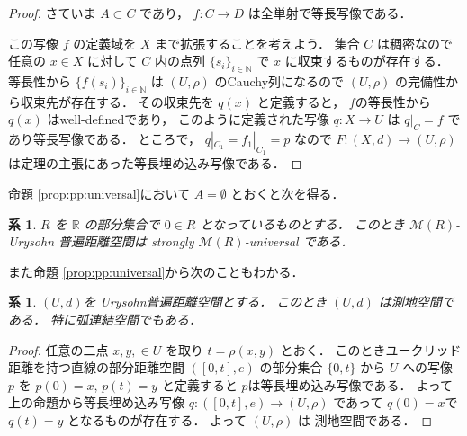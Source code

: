 \documentclass[leqno, 12pt]{jsarticle}
\newtheorem{cor}[thm]{系}
\newcommand{\nn}{\mathbb{N}}
\newcommand{\rr}{\mathbb{R}}
\begin{document}
\begin{proof}
さていま
$A\subset C$
であり，
$f\colon  C\to D$
は全単射で等長写像である．



この写像
$f$
の定義域を
$X$
まで拡張することを考えよう．
集合
$C$
は稠密なので任意の
$x\in X$
に対して
$C$
内の点列
$\{s_{i}\}_{i\in \nn}$
で
$x$
に収束するものが存在する．
等長性から
$\{f(s_{i})\}_{i\in \nn}$
は
$(U, \rho)$
のCauchy列になるので
$(U, \rho)$
の完備性から収束先が存在する．
その収束先を
$q(x)$
と定義すると，
$f$の等長性から
$q(x)$
はwell-definedであり，
このように定義された写像
$q\colon  X\to U$
は
$q|_{C}=f$
であり等長写像である．
ところで，
$q|_{C_1}=f_{1}|_{C_1}=p$
なので
$F\colon  (X, d)\to (U, \rho)$
は定理の主張にあった等長埋め込み写像である．
\end{proof}


命題 \ref{prop:pp:universal}において
$A=\emptyset$
とおくと次を得る．

\begin{cor}\label{cor:pp:omegauniversality}
$R$
を
$\rr$
の部分集合で
$0\in R$
となっているものとする．
このとき
$\mathscr{M}(R)$-Urysohn
普遍距離空間は
strongly 
$\mathscr{M}(R)$-universal
である．
\end{cor}



また命題 
\ref{prop:pp:universal}から次のこともわかる．

\begin{cor}\label{cor:pp:connected}
$(U, d)$を
Urysohn普遍距離空間とする．
このとき
$(U, d)$
は測地空間である．
特に弧連結空間でもある．
\end{cor}
\begin{proof}
任意の二点
$x, y, \in U$
を取り
$t=\rho(x, y)$
とおく．
このときユークリッド距離を持つ直線の部分距離空間
$([0, t], e)$
の部分集合
$\{0, t\}$
から
$U$
への写像
$p$
を
$p(0)=x$, 
$p(t)=y$
と定義すると
$p$は等長埋め込み写像である．
よって上の命題から等長埋め込み写像
$q: ([0, t], e)\to (U, \rho)$
であって
$q(0)=x$で
$q(t)=y$
となるものが存在する．
よって
$(U, \rho)$
は
測地空間である．
\end{proof}
\end{document}
